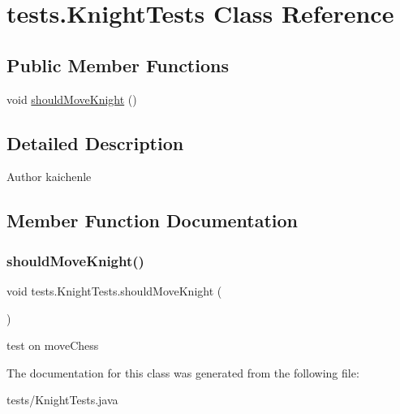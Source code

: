 \hypertarget{classtests_1_1_knight_tests}{}\section{tests.\+Knight\+Tests Class Reference}
\label{classtests_1_1_knight_tests}
\subsection*{Public Member Functions}
\begin{DoxyCompactItemize}
\item 
void \mbox{\hyperlink{classtests_1_1_knight_tests_ac21f03b73fc71f1a1042978344690cb7}{should\+Move\+Knight}} ()
\end{DoxyCompactItemize}


\subsection{Detailed Description}
\begin{DoxyAuthor}{Author}
kaichenle 
\end{DoxyAuthor}


\subsection{Member Function Documentation}
\mbox{\label{classtests_1_1_knight_tests_ac21f03b73fc71f1a1042978344690cb7}} 
\subsubsection{\texorpdfstring{should\+Move\+Knight()}{shouldMoveKnight()}}
{\footnotesize\ttfamily void tests.\+Knight\+Tests.\+should\+Move\+Knight (\begin{DoxyParamCaption}{ }\end{DoxyParamCaption})\hspace{0.3cm}{\ttfamily [inline]}}

test on move\+Chess 

The documentation for this class was generated from the following file\+:\begin{DoxyCompactItemize}
\item 
tests/Knight\+Tests.\+java\end{DoxyCompactItemize}

